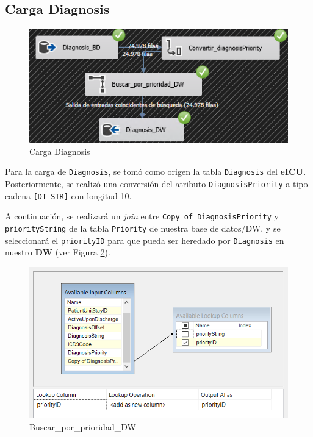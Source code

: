 \documentclass[12pt, a4paper, twoside]{article}
\begin{document}
	\subsection{Carga Diagnosis}
	
	\begin{figure}[h!]
		\centering
		\includegraphics[width=1\textwidth]{image/112_carga_diagnosis.png}
		\caption{Carga Diagnosis}
		\label{fig:21}
	\end{figure}
	
	Para la carga de \texttt{Diagnosis}, se tomó como origen la tabla \texttt{Diagnosis} del \textbf{eICU}. Posteriormente, se realizó una conversión del atributo \texttt{DiagnosisPriority} a tipo cadena \texttt{[DT\_STR]} con longitud 10.
	
	A continuación, se realizará un \textit{join} entre \texttt{Copy of DiagnosisPriority} y \texttt{priorityString} de la tabla \texttt{Priority} de nuestra base de datos/DW, y se seleccionará el \texttt{priorityID} para que pueda ser heredado por \texttt{Diagnosis} en nuestro \textbf{DW} (ver Figura \ref{fig:29}).
	
	\begin{figure}[h!]
		\centering
		\includegraphics[width=1\textwidth]{image/112_carga_diagnosis_lookup.png}
		\caption{Buscar\_por\_prioridad\_DW}
		\label{fig:29}
	\end{figure}
	
\end{document}
